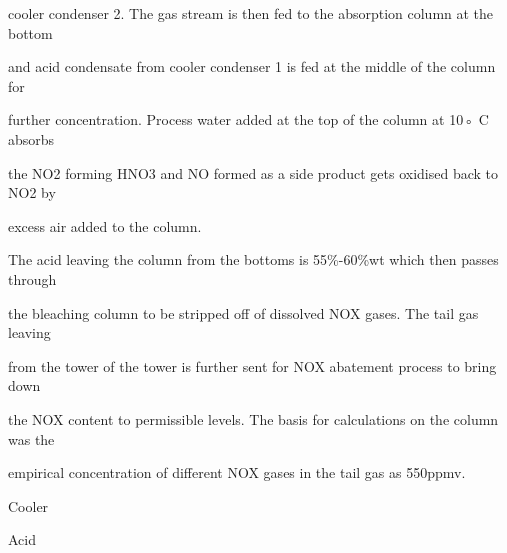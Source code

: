 \documentclass[a4paper,portrait,12pt]{article}
\begin{document}
\begin{flushleft}
cooler condenser 2. The gas stream is then fed to the absorption column at the bottom
\end{flushleft}


\begin{flushleft}
and acid condensate from cooler condenser 1 is fed at the middle of the column for
\end{flushleft}


\begin{flushleft}
further concentration. Process water added at the top of the column at 10◦ C absorbs
\end{flushleft}


\begin{flushleft}
the NO2 forming HNO3 and NO formed as a side product gets oxidised back to NO2 by
\end{flushleft}


\begin{flushleft}
excess air added to the column.
\end{flushleft}


\begin{flushleft}
The acid leaving the column from the bottoms is 55\%-60\%wt which then passes through
\end{flushleft}


\begin{flushleft}
the bleaching column to be stripped off of dissolved NOX gases. The tail gas leaving
\end{flushleft}


\begin{flushleft}
from the tower of the tower is further sent for NOX abatement process to bring down
\end{flushleft}


\begin{flushleft}
the NOX content to permissible levels. The basis for calculations on the column was the
\end{flushleft}


\begin{flushleft}
empirical concentration of different NOX gases in the tail gas as 550ppmv.
\end{flushleft}





\begin{flushleft}
Cooler
\end{flushleft}


\begin{flushleft}
Acid
\end{flushleft}
\end{document}
